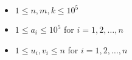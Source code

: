 \begin{itemize}
\tightlist
\item $1 \leq n,m,k \leq 10^5$
\item $1 \leq a_i \leq 10^5$ for $i=1,2,\ldots,n$
\item $1 \leq u_i,v_i \leq n$ for $i=1,2,\ldots,n$
\end{itemize}

